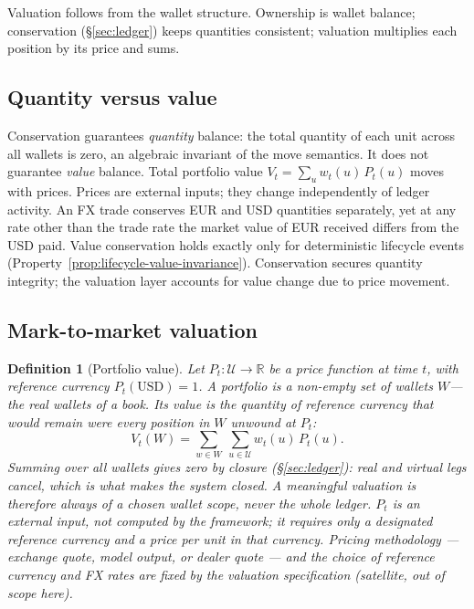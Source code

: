 \documentclass[11pt,a4paper]{article}
\newtheorem{definition}{Definition}[section]
\begin{document}
Valuation follows from the wallet structure. Ownership is wallet balance; conservation (\S\ref{sec:ledger}) keeps quantities consistent; valuation multiplies each position by its price and sums.

\subsection{Quantity versus value}

Conservation guarantees \emph{quantity} balance: the total quantity of each unit across all wallets is zero, an algebraic invariant of the move semantics. It does not guarantee \emph{value} balance. Total portfolio value $V_t = \sum_u w_t(u)\,P_t(u)$ moves with prices. Prices are external inputs; they change independently of ledger activity. An FX trade conserves EUR and USD quantities separately, yet at any rate other than the trade rate the market value of EUR received differs from the USD paid. Value conservation holds exactly only for deterministic lifecycle events (Property~\ref{prop:lifecycle-value-invariance}). Conservation secures quantity integrity; the valuation layer accounts for value change due to price movement.

\subsection{Mark-to-market valuation}

\begin{definition}[Portfolio value]
\label{def:portfolio-value}
Let $P_t : \mathcal{U} \to \mathbb{R}$ be a price function at time $t$, with reference currency $P_t(\mathrm{USD}) = 1$. A portfolio is a non-empty set of wallets $W$---the real wallets of a book. Its value is the quantity of reference currency that would remain were every position in $W$ unwound at $P_t$:
\[
V_t(W) = \sum_{w \in W}\ \sum_{u \in \mathcal{U}} w_t(u)\,P_t(u).
\]
Summing over \emph{all} wallets gives zero by closure (\S\ref{sec:ledger}): real and virtual legs cancel, which is what makes the system closed. A meaningful valuation is therefore always of a chosen wallet scope, never the whole ledger. $P_t$ is an external input, not computed by the framework; it requires only a designated reference currency and a price per unit in that currency. Pricing methodology --- exchange quote, model output, or dealer quote --- and the choice of reference currency and FX rates are fixed by the valuation specification (satellite, out of scope here).
\end{definition}
\end{document}
